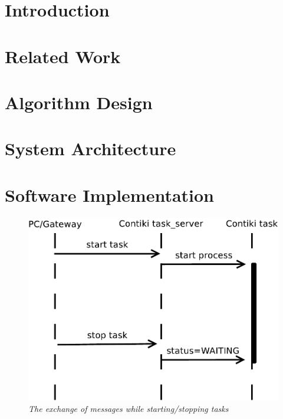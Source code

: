 \documentclass[11pt, oneside, a4paper, oldfontcommands]{memoir}
\begin{document}
\frontmatter


\mainmatter

\chapter{Introduction}

\chapter{Related Work}
\chapter{Algorithm Design}

\chapter{System Architecture}

\chapter{Software Implementation}

\begin{figure}[ht]
 \begin{center}
  \includegraphics[scale=0.5]{img/starttask.pdf}
 \end{center}
 \caption{\small \itshape{The exchange of messages while starting/stopping tasks}}
\end{figure}
\end{document}
